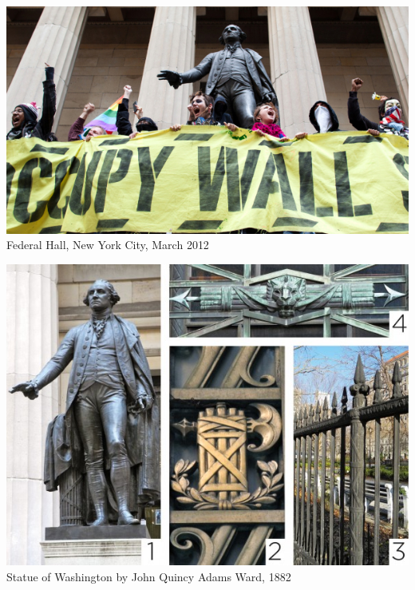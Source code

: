 \begin{frame}
    \centering
    \includegraphics[width=.9\textwidth]{img/fasces/ows.jpg} \\
    Federal Hall, New York City, March 2012 \\
\end{frame}
\begin{frame}
    \centering
    \includegraphics[width=.9\textwidth]{img/fasces/fasces-stuff.jpg} \\
    Statue of Washington by John Quincy Adams Ward, 1882 \\
\end{frame}
